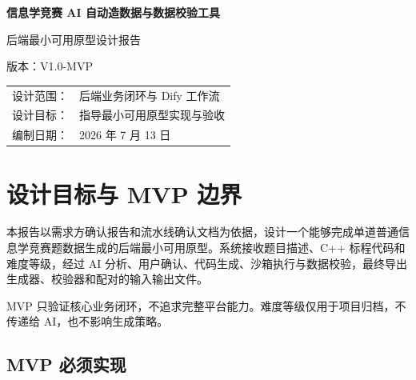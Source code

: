 \documentclass[UTF8,zihao=-4]{ctexart}
\newcommand{\projectname}{信息学竞赛 AI 自动造数据与数据校验工具}
\newcommand{\docversion}{V1.0-MVP}
\begin{document}
\begin{titlepage}
  \centering
  \vspace*{2.2cm}
  {\Huge\bfseries \projectname\par}
  \vspace{0.8cm}
  {\LARGE 后端最小可用原型设计报告\par}
  \vspace{1.1cm}
  {\large 版本：\docversion\par}
  \vfill
  \begin{tabular}{rl}
    设计范围： & 后端业务闭环与 Dify 工作流 \\
    设计目标： & 指导最小可用原型实现与验收 \\
    编制日期： & 2026 年 7 月 13 日 \\
  \end{tabular}
  \vfill
\end{titlepage}

\tableofcontents
\newpage

\section{设计目标与 MVP 边界}

本报告以需求方确认报告和流水线确认文档为依据，设计一个能够完成单道普通信息学竞赛题数据生成的后端最小可用原型。系统接收题目描述、C++ 标程代码和难度等级，经过 AI 分析、用户确认、代码生成、沙箱执行与数据校验，最终导出生成器、校验器和配对的输入输出文件。

MVP 只验证核心业务闭环，不追求完整平台能力。难度等级仅用于项目归档，不传递给 AI，也不影响生成策略。

\subsection{MVP 必须实现}
\end{document}
